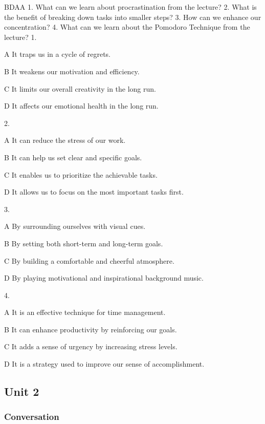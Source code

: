 \begin{enumerate}
	BDAA
	1. What can we learn about procrastination from the lecture?
	2. What is the benefit of breaking down tasks into smaller steps?
	3. How can we enhance our concentration?
	4. What can we learn about the Pomodoro Technique from the lecture?
	1.
	
	A
	It traps us in a cycle of regrets.
	
	B
	It weakens our motivation and efficiency.
	
	C
	It limits our overall creativity in the long run.
	
	D
	It affects our emotional health in the long run.
	
	2.
	
	A
	It can reduce the stress of our work.
	
	B
	It can help us set clear and specific goals.
	
	C
	It enables us to prioritize the achievable tasks.
	
	D
	It allows us to focus on the most important tasks first.
	
	3.
	
	A
	By surrounding ourselves with visual cues.
	
	B
	By setting both short-term and long-term goals.
	
	C
	By building a comfortable and cheerful atmosphere.
	
	D
	By playing motivational and inspirational background music.
	
	4.
	
	A
	It is an effective technique for time management.
	
	B
	It can enhance productivity by reinforcing our goals.
	
	C
	It adds a sense of urgency by increasing stress levels.
	
	D
	It is a strategy used to improve our sense of accomplishment.
\end{enumerate}


\newpage
\subsection{Unit 2}

\subsubsection{Conversation}

